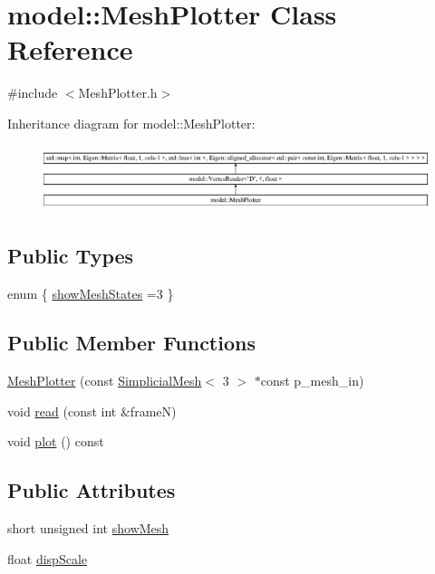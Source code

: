 \hypertarget{classmodel_1_1_mesh_plotter}{}\section{model\+:\+:Mesh\+Plotter Class Reference}
\label{classmodel_1_1_mesh_plotter}


{\ttfamily \#include $<$Mesh\+Plotter.\+h$>$}

Inheritance diagram for model\+:\+:Mesh\+Plotter\+:\begin{figure}[H]
\begin{center}
\leavevmode
\includegraphics[height=1.953488cm]{classmodel_1_1_mesh_plotter}
\end{center}
\end{figure}
\subsection*{Public Types}
\begin{DoxyCompactItemize}
\item 
enum \{ \hyperlink{classmodel_1_1_mesh_plotter_a55919b8d75885879e97478801bd84b74a4d29b0e5d3671e5c619b56278761d934}{show\+Mesh\+States} =3
 \}
\end{DoxyCompactItemize}
\subsection*{Public Member Functions}
\begin{DoxyCompactItemize}
\item 
\hyperlink{classmodel_1_1_mesh_plotter_a6efea758bc9be92cfc809d577985518c}{Mesh\+Plotter} (const \hyperlink{classmodel_1_1_simplicial_mesh}{Simplicial\+Mesh}$<$ 3 $>$ $\ast$const p\+\_\+mesh\+\_\+in)
\item 
void \hyperlink{classmodel_1_1_mesh_plotter_a072e8c3c17d7b7ad6c22b7b84ca3e334}{read} (const int \&frame\+N)
\item 
void \hyperlink{classmodel_1_1_mesh_plotter_acce138d1097f38ed62e947a2f5d1774d}{plot} () const 
\end{DoxyCompactItemize}
\subsection*{Public Attributes}
\begin{DoxyCompactItemize}
\item 
short unsigned int \hyperlink{classmodel_1_1_mesh_plotter_a7166e825bfb9a386429d2d38f0587904}{show\+Mesh}
\item 
float \hyperlink{classmodel_1_1_mesh_plotter_a06b31c3208c2618cd62b267e8662d649}{disp\+Scale}
\end{DoxyCompactItemize}
